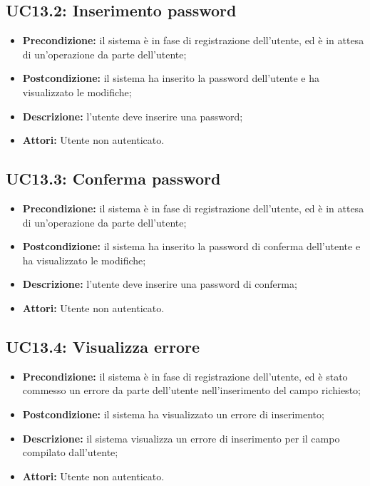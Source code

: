 \subsection{ UC13.2: Inserimento password}

\begin{itemize}
	\item \textbf{Precondizione:} il sistema è in fase di registrazione dell'utente, ed è in attesa di un'operazione da parte dell'utente;
	\item \textbf{Postcondizione:} il sistema ha inserito la password dell'utente e ha visualizzato le modifiche;
	\item \textbf{Descrizione:} l'utente deve inserire una password;
	\item \textbf{Attori:} Utente non autenticato.
\end{itemize}
\subsection{ UC13.3: Conferma password}

\begin{itemize}
	\item \textbf{Precondizione:} il sistema è in fase di registrazione dell'utente, ed è in attesa di un'operazione da parte dell'utente;
	\item \textbf{Postcondizione:} il sistema ha inserito la password di conferma dell'utente e ha visualizzato le modifiche;
	\item \textbf{Descrizione:} l'utente deve inserire una password di conferma;
	\item \textbf{Attori:} Utente non autenticato.
\end{itemize}
\subsection{ UC13.4: Visualizza errore}

\begin{itemize}
	\item \textbf{Precondizione:} il sistema è in fase di registrazione dell'utente, ed è stato commesso un errore da parte dell'utente nell'inserimento del campo richiesto;
	\item \textbf{Postcondizione:} il sistema ha visualizzato un errore di inserimento;
	\item \textbf{Descrizione:} il sistema visualizza un errore di inserimento per il campo compilato dall'utente;
	\item \textbf{Attori:} Utente non autenticato.
\end{itemize}
